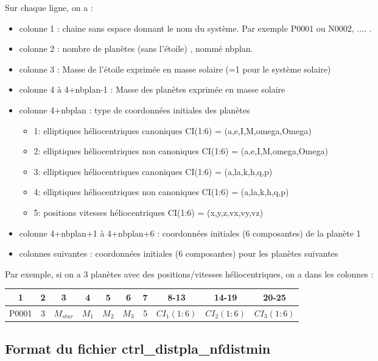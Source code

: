 \documentclass[11pt]{article}
\begin{document}
Sur chaque ligne, on a :
\begin{itemize}
\item colonne 1 : chaine sans espace donnant le nom du syst\`eme. Par exemple P0001 ou N0002, .... .
\item colonne 2 : nombre de plan\`etes (sans l'\'etoile) , nomm\'e nbplan.
\item colonne 3 : Masse de  l'\'etoile exprimée en masse solaire (=1 pour le système solaire)
\item colonne 4 \`a 4+nbplan-1 : Masse des plan\`etes exprimée en masse solaire 
\item colonne 4+nbplan : type de coordonn\'ees initiales des plan\`etes
\begin{itemize}
\item 1:  elliptiques h\'eliocentriques canoniques
	     CI(1:6) = (a,e,I,M,omega,Omega)
\item 2:  elliptiques h\'eliocentriques non canoniques
	     CI(1:6) = (a,e,I,M,omega,Omega)
\item 3:  elliptiques h\'eliocentriques canoniques
	     CI(1:6) = (a,la,k,h,q,p)
\item 4:  elliptiques h\'eliocentriques non canoniques
	     CI(1:6) = (a,la,k,h,q,p)
\item 5:  positions vitesses h\'eliocentriques
	     CI(1:6) = (x,y,z,vx,vy,vz)
\end{itemize}

\item colonne 4+nbplan+1 \`a  4+nbplan+6 :   coordonn\'ees initiales (6 composantes) de la plan\`ete 1
\item  colonnes suivantes :   coordonn\'ees initiales (6 composantes) pour les plan\`etes suivantes
\end{itemize}

 Par exemple, si on a 3 plan\`etes avec des positions/vitesses h\'eliocentriques, on a dans les colonnes :
 
\begin{tabular}{|c|c|c|c|c|c|c|c|c|c|} \hline
1 &  2 &  3 & 4 & 5 &6 &7 &8-13 &14-19 &20-25 \\ \hline
P0001 & 3 & $M_{star}$  & $M_1$ &  $M_2$ & $M_3$  &5 &$CI_1(1:6)$ & $CI_2(1:6)$&$CI_3(1:6)$\\    \hline
\end{tabular}


\subsection{Format du fichier ctrl\_distpla\_nfdistmin }
\end{document}
